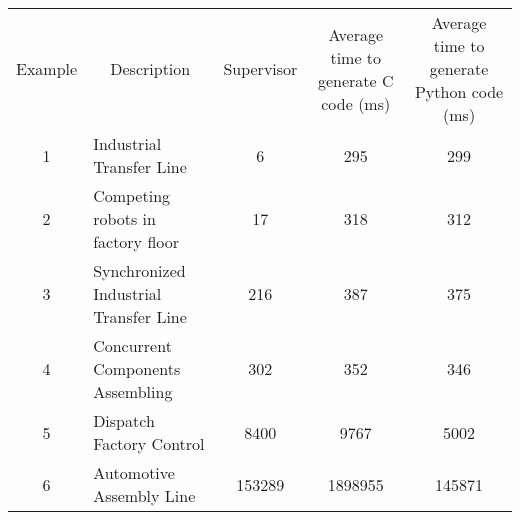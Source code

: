 \begin{table}[]
    \begin{tabular}{c|l|c|c|c}
    Example & \multicolumn{1}{c}{Description}       & Supervisor & Average time to generate C code (ms) & Average time to generate Python code (ms) \\
    1       & Industrial Transfer Line              & 6          & 295                                  & 299                                       \\
    2       & Competing robots in factory floor     & 17         & 318                                  & 312                                       \\
    3       & Synchronized Industrial Transfer Line & 216        & 387                                  & 375                                       \\
    4       & Concurrent Components Assembling      & 302        & 352                                  & 346                                       \\
    5       & Dispatch Factory Control              & 8400       & 9767                                 & 5002                                      \\
    6       & Automotive Assembly Line              & 153289     & 1898955                              & 145871                                   
    \end{tabular}
    \end{table}

